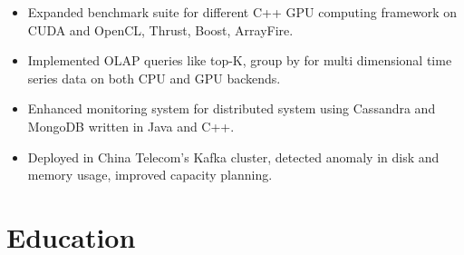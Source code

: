 \documentclass[11pt, letterpaper]{simple-cv}
\begin{document}

\begin{itemize}
	\item Expanded benchmark suite for different C++ GPU computing framework on CUDA and OpenCL, Thrust, Boost, ArrayFire.
	\item Implemented OLAP queries like top-K, group by for multi dimensional time series data on both CPU and GPU backends.
\end{itemize}


\begin{itemize}
	\item Enhanced monitoring system for distributed system using Cassandra and MongoDB written in Java and C++.
	\item Deployed in China Telecom's Kafka cluster, detected anomaly in disk and memory usage, improved capacity planning.
\end{itemize}




\section{Education}
{}
\end{document}
